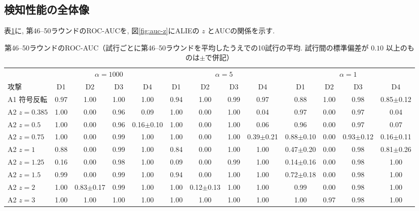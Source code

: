 \documentclass[a4j, dvipdfmx]{jsarticle}
\begin{document}
\subsection{検知性能の全体像}
\label{sec:res-final}

表\ref{tab:final-auc}に, 第46--50ラウンドのROC-AUCを, 図\ref{fig:auc-z}にALIEの $z$ とAUCの関係を示す.

\begin{table}[t]
\centering
\caption{第46--50ラウンドのROC-AUC（試行ごとに第46--50ラウンドを平均したうえでの10試行の平均. 試行間の標準偏差が $0.10$ 以上のものは$\pm$で併記）}
\label{tab:final-auc}
\footnotesize
\tabcolsep=3.5pt
\begin{tabular}{@{}l@{\hspace{5pt}}cccc@{\hspace{8pt}}cccc@{\hspace{8pt}}cccc@{}}
\toprule
 & \multicolumn{4}{c}{$\alpha=1000$} & \multicolumn{4}{c}{$\alpha=5$} & \multicolumn{4}{c}{$\alpha=1$} \\
\cmidrule(lr){2-5}\cmidrule(lr){6-9}\cmidrule(l){10-13}
攻撃 & D1 & D2 & D3 & D4 & D1 & D2 & D3 & D4 & D1 & D2 & D3 & D4 \\
\midrule
A1 符号反転 & 0.97 & 1.00 & 1.00 & 1.00 & 0.94 & 1.00 & 0.99 & 0.97 & 0.88 & 1.00 & 0.98 & 0.85$\pm$0.12 \\
\midrule
A2 $z{=}0.385$ & 1.00 & 0.00 & 0.96 & 0.09 & 1.00 & 0.00 & 1.00 & 0.04 & 0.97 & 0.00 & 0.97 & 0.04 \\
A2 $z{=}0.5$ & 1.00 & 0.00 & 0.96 & 0.16$\pm$0.10 & 1.00 & 0.00 & 1.00 & 0.06 & 0.96 & 0.00 & 0.97 & 0.07 \\
A2 $z{=}0.75$ & 1.00 & 0.00 & 0.99 & 1.00 & 1.00 & 0.00 & 1.00 & 0.39$\pm$0.21 & 0.88$\pm$0.10 & 0.00 & 0.93$\pm$0.12 & 0.16$\pm$0.11 \\
A2 $z{=}1$ & 0.88 & 0.00 & 0.99 & 1.00 & 0.84 & 0.00 & 1.00 & 1.00 & 0.47$\pm$0.20 & 0.00 & 0.98 & 0.81$\pm$0.26 \\
A2 $z{=}1.25$ & 0.16 & 0.00 & 0.98 & 1.00 & 0.09 & 0.00 & 0.99 & 1.00 & 0.14$\pm$0.16 & 0.00 & 0.98 & 1.00 \\
A2 $z{=}1.5$ & 0.99 & 0.00 & 0.99 & 1.00 & 0.94 & 0.00 & 1.00 & 1.00 & 0.72$\pm$0.18 & 0.00 & 0.98 & 1.00 \\
A2 $z{=}2$ & 1.00 & 0.83$\pm$0.17 & 0.99 & 1.00 & 1.00 & 0.12$\pm$0.13 & 1.00 & 1.00 & 0.99 & 0.00 & 0.98 & 1.00 \\
A2 $z{=}3$ & 1.00 & 1.00 & 1.00 & 1.00 & 1.00 & 1.00 & 1.00 & 1.00 & 1.00 & 0.97 & 0.98 & 1.00 \\
\bottomrule
\end{tabular}
\end{table}
\end{document}
